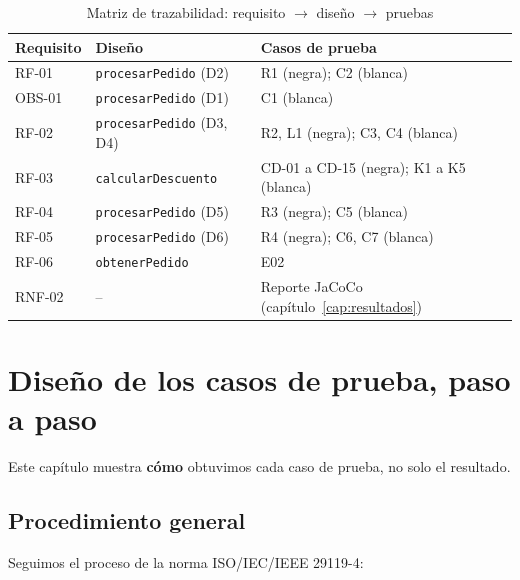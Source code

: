 \documentclass[11pt,a4paper,oneside]{report}
\newcommand{\code}[1]{\texttt{#1}}
\begin{document}
\begin{table}[H]
\centering
\caption{Matriz de trazabilidad: requisito $\rightarrow$ diseño $\rightarrow$ pruebas}
\small
\begin{tabularx}{\linewidth}{llX}
\toprule
\textbf{Requisito} & \textbf{Diseño} & \textbf{Casos de prueba}\\
\midrule
RF-01 & \code{procesarPedido} (D2) & R1 (negra); C2 (blanca)\\
OBS-01 & \code{procesarPedido} (D1) & C1 (blanca)\\
RF-02 & \code{procesarPedido} (D3, D4) & R2, L1 (negra); C3, C4 (blanca)\\
RF-03 & \code{calcularDescuento} & CD-01 a CD-15 (negra); K1 a K5 (blanca)\\
RF-04 & \code{procesarPedido} (D5) & R3 (negra); C5 (blanca)\\
RF-05 & \code{procesarPedido} (D6) & R4 (negra); C6, C7 (blanca)\\
RF-06 & \code{obtenerPedido} & E02\\
RNF-02 & -- & Reporte JaCoCo (capítulo~\ref{cap:resultados})\\
\bottomrule
\end{tabularx}
\end{table}

\chapter{Diseño de los casos de prueba, paso a paso}
\label{cap:pasoapaso}
Este capítulo muestra \textbf{cómo} obtuvimos cada caso de prueba, no solo el resultado.

\section{Procedimiento general}
Seguimos el proceso de la norma ISO/IEC/IEEE 29119-4:
\end{document}
